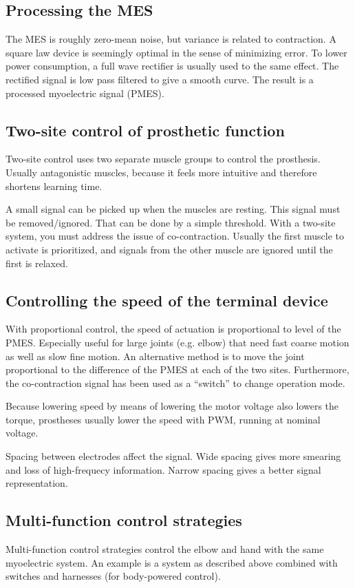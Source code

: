 \subsection{Processing the MES}
The MES is roughly zero-mean noise, but variance is related to contraction. A square law device is seemingly optimal in the sense of minimizing error. To lower power consumption, a full wave rectifier is usually used to the same effect. The rectified signal is low pass filtered to give a smooth curve. The result is a processed myoelectric signal (PMES).

\subsection{Two-site control of prosthetic function}
Two-site control uses two separate muscle groups to control the prosthesis. Usually antagonistic muscles, because it feels more intuitive and therefore shortens learning time.

A small signal can be picked up when the muscles are resting. This signal must be removed/ignored. That can be done by a simple threshold. With a two-site system, you must address the issue of co-contraction. Usually the first muscle to activate is prioritized, and signals from the other muscle are ignored until the first is relaxed.

\subsection{Controlling the speed of the terminal device}
With proportional control, the speed of actuation is proportional to level of the PMES. Especially useful for large joints (e.g. elbow) that need fast coarse motion as well as slow fine motion. An alternative method is to move the joint proportional to the difference of the PMES at each of the two sites. Furthermore, the co-contraction signal has been used as a ``switch'' to change operation mode.

Because lowering speed by means of lowering the motor voltage also lowers the torque, prostheses usually lower the speed with PWM, running at nominal voltage.

Spacing between electrodes affect the signal. Wide spacing gives more smearing and loss of high-frequecy information. Narrow spacing gives a better signal representation.

\subsection{Multi-function control strategies}
Multi-function control strategies control the elbow and hand with the same myoelectric system. An example is a system as described above combined with switches and harnesses (for body-powered control).


